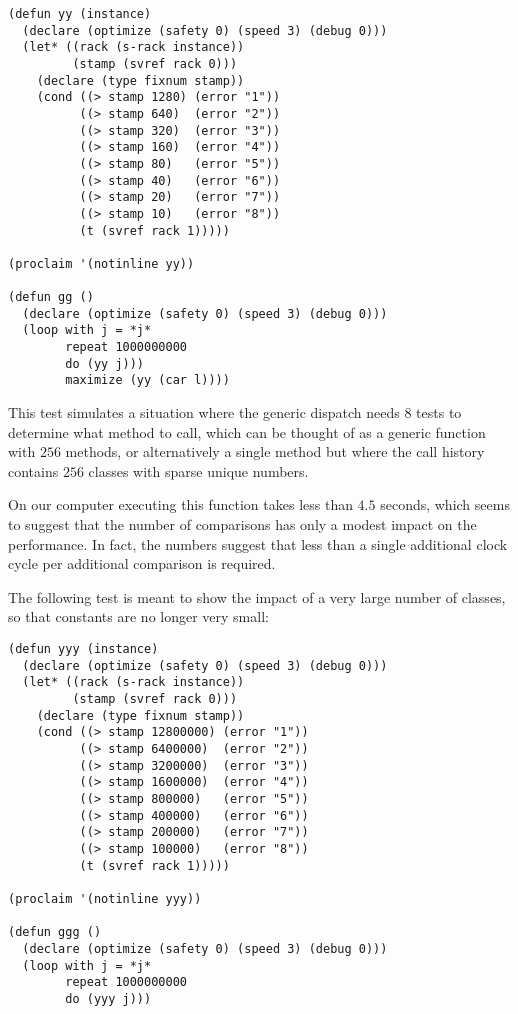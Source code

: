 \begin{verbatim}
(defun yy (instance)
  (declare (optimize (safety 0) (speed 3) (debug 0)))
  (let* ((rack (s-rack instance))
         (stamp (svref rack 0)))
    (declare (type fixnum stamp))
    (cond ((> stamp 1280) (error "1"))
          ((> stamp 640)  (error "2"))
          ((> stamp 320)  (error "3"))
          ((> stamp 160)  (error "4"))
          ((> stamp 80)   (error "5"))
          ((> stamp 40)   (error "6"))
          ((> stamp 20)   (error "7"))
          ((> stamp 10)   (error "8"))
          (t (svref rack 1)))))

(proclaim '(notinline yy))

(defun gg ()
  (declare (optimize (safety 0) (speed 3) (debug 0)))
  (loop with j = *j*
        repeat 1000000000
        do (yy j)))
        maximize (yy (car l))))
\end{verbatim}

This test simulates a situation where the generic dispatch needs $8$
tests to determine what method to call, which can be thought of as a
generic function with $256$ methods, or alternatively a single method
but where the call history contains $256$ classes with sparse unique
numbers. 

On our computer executing this function takes less than $4.5$ seconds,
which seems to suggest that the number of comparisons has only a
modest impact on the performance.  In fact, the numbers suggest that
less than a single additional clock cycle per additional comparison is
required. 

The following test is meant to show the impact of a very large number
of classes, so that constants are no longer very small:

\begin{verbatim}
(defun yyy (instance)
  (declare (optimize (safety 0) (speed 3) (debug 0)))
  (let* ((rack (s-rack instance))
         (stamp (svref rack 0)))
    (declare (type fixnum stamp))
    (cond ((> stamp 12800000) (error "1"))
          ((> stamp 6400000)  (error "2"))
          ((> stamp 3200000)  (error "3"))
          ((> stamp 1600000)  (error "4"))
          ((> stamp 800000)   (error "5"))
          ((> stamp 400000)   (error "6"))
          ((> stamp 200000)   (error "7"))
          ((> stamp 100000)   (error "8"))
          (t (svref rack 1)))))

(proclaim '(notinline yyy))

(defun ggg ()
  (declare (optimize (safety 0) (speed 3) (debug 0)))
  (loop with j = *j*
        repeat 1000000000
        do (yyy j)))
\end{verbatim}


